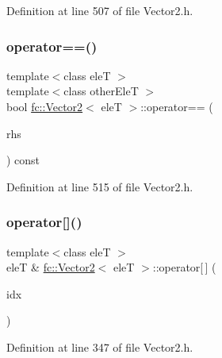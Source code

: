 Definition at line 507 of file Vector2.\+h.

\mbox{\label{classfc_1_1Vector2_a05acd66d911bf36944147ca102db1000}} 
\subsubsection{\texorpdfstring{operator==()}{operator==()}}
{\footnotesize\ttfamily template$<$class eleT $>$ \\
template$<$class other\+EleT $>$ \\
bool \hyperlink{classfc_1_1Vector2}{fc\+::\+Vector2}$<$ eleT $>$\+::operator== (\begin{DoxyParamCaption}\item[{const \hyperlink{classfc_1_1Vector2}{Vector2}$<$ other\+EleT $>$ \&}]{rhs }\end{DoxyParamCaption}) const}



Definition at line 515 of file Vector2.\+h.

\mbox{\label{classfc_1_1Vector2_abb9db025bf3896fa1d14faa5d905cb43}} 
\subsubsection{\texorpdfstring{operator[]()}{operator[]()}\hspace{0.1cm}{\footnotesize\ttfamily [1/2]}}
{\footnotesize\ttfamily template$<$class eleT $>$ \\
eleT \& \hyperlink{classfc_1_1Vector2}{fc\+::\+Vector2}$<$ eleT $>$\+::operator\mbox{[}$\,$\mbox{]} (\begin{DoxyParamCaption}\item[{std\+::size\+\_\+t}]{idx }\end{DoxyParamCaption})}



Definition at line 347 of file Vector2.\+h.

\mbox{\label{classfc_1_1Vector2_a22b3832145d462caeb294767416253ef}} 
